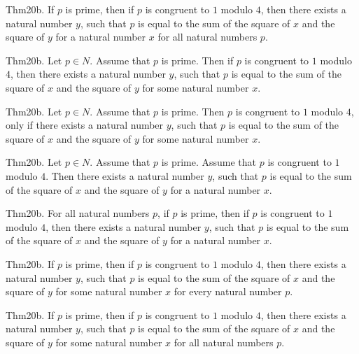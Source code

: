 \documentclass{article}
\begin{document}
Thm20b. If $p$ is prime, then if $p$ is congruent to $1$ modulo $4$, then there exists a natural number $y$, such that $p$ is equal to the sum of the square of $x$ and the square of $y$ for a natural number $x$ for all natural numbers $p$.

Thm20b. Let $p \in N$. Assume that $p$ is prime. Then if $p$ is congruent to $1$ modulo $4$, then there exists a natural number $y$, such that $p$ is equal to the sum of the square of $x$ and the square of $y$ for some natural number $x$.

Thm20b. Let $p \in N$. Assume that $p$ is prime. Then $p$ is congruent to $1$ modulo $4$, only if there exists a natural number $y$, such that $p$ is equal to the sum of the square of $x$ and the square of $y$ for some natural number $x$.

Thm20b. Let $p \in N$. Assume that $p$ is prime. Assume that $p$ is congruent to $1$ modulo $4$. Then there exists a natural number $y$, such that $p$ is equal to the sum of the square of $x$ and the square of $y$ for a natural number $x$.

Thm20b. For all natural numbers $p$, if $p$ is prime, then if $p$ is congruent to $1$ modulo $4$, then there exists a natural number $y$, such that $p$ is equal to the sum of the square of $x$ and the square of $y$ for a natural number $x$.

Thm20b. If $p$ is prime, then if $p$ is congruent to $1$ modulo $4$, then there exists a natural number $y$, such that $p$ is equal to the sum of the square of $x$ and the square of $y$ for some natural number $x$ for every natural number $p$.

Thm20b. If $p$ is prime, then if $p$ is congruent to $1$ modulo $4$, then there exists a natural number $y$, such that $p$ is equal to the sum of the square of $x$ and the square of $y$ for some natural number $x$ for all natural numbers $p$.
\end{document}

